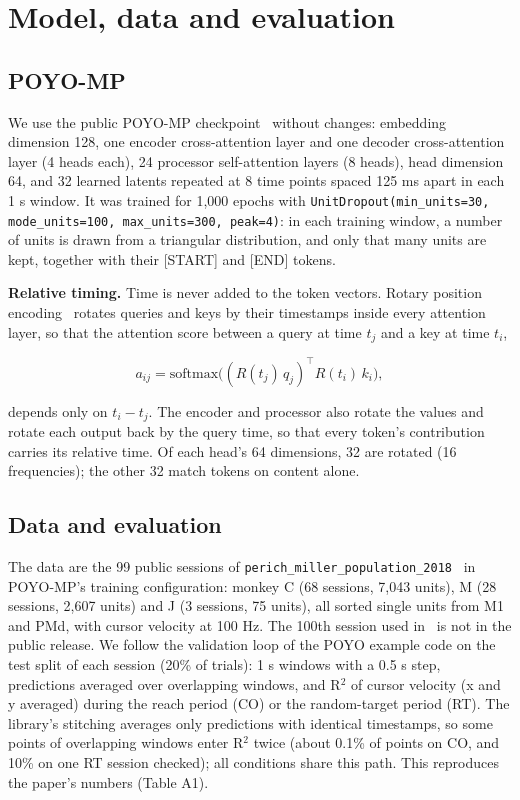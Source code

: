 \documentclass[11pt]{article}
\begin{document}
\clearpage
\appendix
\setcounter{figure}{0}
\renewcommand{\thefigure}{S\arabic{figure}}

\setcounter{table}{0}
\renewcommand{\thetable}{A\arabic{table}}
\section{Model, data and evaluation}

\subsection{POYO-MP}

We use the public POYO-MP checkpoint~\cite{ref1} without changes: embedding dimension 128, one encoder cross-attention layer and one decoder cross-attention layer (4 heads each), 24 processor self-attention layers (8 heads), head dimension 64, and 32 learned latents repeated at 8 time points spaced 125 ms apart in each 1 s window. It was trained for 1,000 epochs with \texttt{UnitDropout(\allowbreak{}min\_units=30,\allowbreak{} mode\_units=100,\allowbreak{} max\_units=300,\allowbreak{} peak=4)}: in each training window, a number of units is drawn from a triangular distribution, and only that many units are kept, together with their [START] and [END] tokens.

\textbf{Relative timing.} Time is never added to the token vectors. Rotary position encoding~\cite{ref4} rotates queries and keys by their timestamps inside every attention layer, so that the attention score between a query at time $t_j$ and a key at time $t_i$,

\[a_{ij} = \mathrm{softmax}\big((R(t_j)\,q_j)^\top R(t_i)\,k_i\big),\]

depends only on $t_i - t_j$. The encoder and processor also rotate the values and rotate each output back by the query time, so that every token's contribution carries its relative time. Of each head's 64 dimensions, 32 are rotated (16 frequencies); the other 32 match tokens on content alone.

\subsection{Data and evaluation}

The data are the 99 public sessions of \texttt{perich\_miller\_population\_2018}~\cite{ref3} in POYO-MP's training configuration: monkey C (68 sessions, 7,043 units), M (28 sessions, 2,607 units) and J (3 sessions, 75 units), all sorted single units from M1 and PMd, with cursor velocity at 100 Hz. The 100th session used in~\cite{ref1} is not in the public release. We follow the validation loop of the POYO example code on the test split of each session (20\% of trials): 1 s windows with a 0.5 s step, predictions averaged over overlapping windows, and R$^{2}$ of cursor velocity (x and y averaged) during the reach period (CO) or the random-target period (RT). The library's stitching averages only predictions with identical timestamps, so some points of overlapping windows enter R$^{2}$ twice (about 0.1\% of points on CO, and 10\% on one RT session checked); all conditions share this path. This reproduces the paper's numbers (Table A1).
\end{document}
